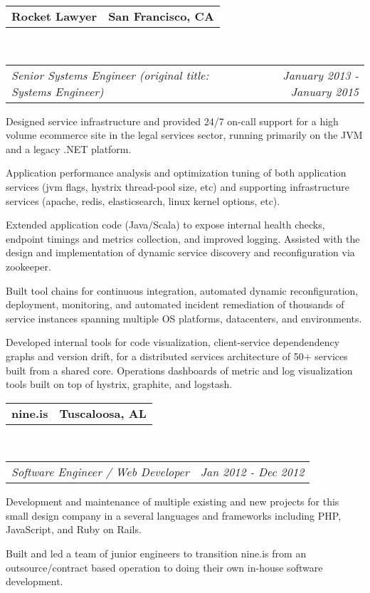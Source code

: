 \documentclass[10pt,letterpaper]{article}
\makeatletter
\newcommand{\headerrow}[2]
{\begin{tabular*}{\linewidth}{l@{\extracolsep{\fill}}r}
	#1 &
	#2 \\
\end{tabular*}}
\newcommand{\employment}[5]{
	\headerrow
		{\textbf{#1}}
		{\textbf{#2}}
	\\
	\headerrow
		{\emph{#3}}
		{\emph{#4}}
	\begin{itemize*}
		\item #5
	\end{itemize*}
}
\makeatother
\begin{document}
\employment{Rocket Lawyer}{San Francisco, CA}{Senior Systems Engineer (original
  title: Systems Engineer)}{January 2013 - January 2015}{
Designed service infrastructure and provided 24/7 on-call support for a high volume ecommerce site in the legal services sector, running primarily on the JVM and a legacy .NET platform.
\item Application performance analysis and optimization tuning of both application services (jvm flags, hystrix thread-pool size, etc) and supporting infrastructure services (apache, redis, elasticsearch, linux kernel options, etc).
\item Extended application code (Java/Scala) to expose internal health checks, endpoint timings and metrics collection, and improved logging. Assisted with the design and implementation of dynamic service discovery and reconfiguration via zookeeper.
\item Built tool chains for continuous integration, automated dynamic reconfiguration, deployment, monitoring, and automated incident remediation of thousands of service instances spanning multiple OS platforms, datacenters, and environments.
\item Developed internal tools for code visualization, client-service dependendency graphs and version drift, for a distributed services architecture of 50+ services built from a shared core. Operations dashboards of metric and log visualization tools built on top of hystrix, graphite, and logstash.
}

\employment{nine.is}{Tuscaloosa, AL}{Software Engineer / Web Developer}{Jan 2012 - Dec 2012}{
Development and maintenance of multiple existing and new projects for this small design company in a several languages and frameworks including PHP, JavaScript, and Ruby on Rails.
\item Built and led a team of junior engineers to transition nine.is from an
  outsource/contract based operation to doing their own in-house software development.
}
\end{document}
